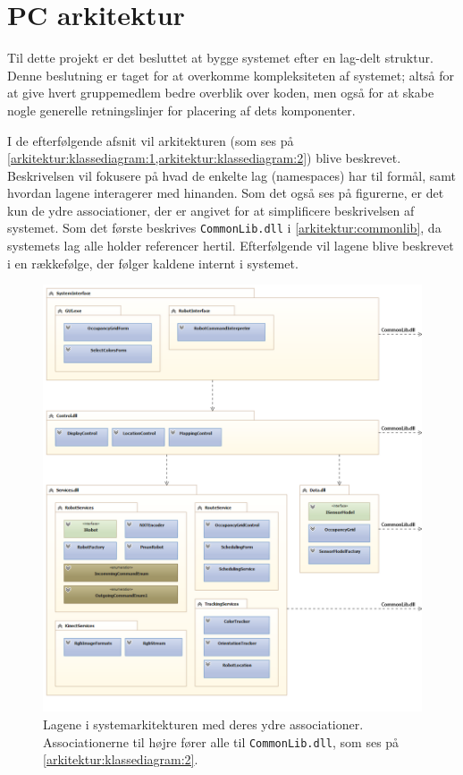 \section{PC arkitektur}\label{arkitektur}
Til dette projekt er det besluttet at bygge systemet efter en lag-delt struktur.
Denne beslutning er taget for at overkomme kompleksiteten af systemet; altså for at give hvert gruppemedlem bedre overblik over koden, men også for at skabe nogle generelle retningslinjer for placering af dets komponenter.

I de efterfølgende afsnit vil arkitekturen (som ses på  \cref{arkitektur:klassediagram:1,arkitektur:klassediagram:2}) blive beskrevet.
Beskrivelsen vil fokusere på hvad de enkelte lag (namespaces) har til formål, samt hvordan lagene interagerer med hinanden.
Som det også ses på figurerne, er det kun de ydre associationer, der er angivet for at simplificere beskrivelsen af systemet.
Som det første beskrives \lstinline[style=csharp]!CommonLib.dll! i \cref{arkitektur:commonlib}, da systemets lag alle holder referencer hertil.
Efterfølgende vil lagene blive beskrevet i en rækkefølge, der følger kaldene internt i systemet.
\begin{figure}
\centering
\includegraphics[width=1\textwidth]{./graphics/systemarkitektur_1}
\caption{Lagene i systemarkitekturen med deres ydre associationer. Associationerne til højre fører alle til \lstinline[style=csharp]!CommonLib.dll!, som ses på \cref{arkitektur:klassediagram:2}.}
\label{arkitektur:klassediagram:1}
\end{figure}


